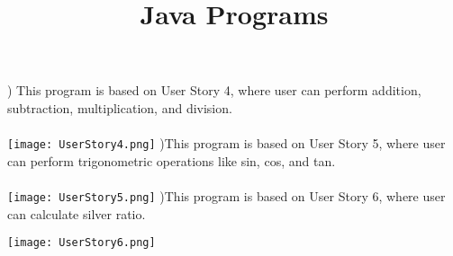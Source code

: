\documentclass[12pt]{article}
\begin{document}
\title{Java Programs}
\date{\vspace{-5ex}}
\maketitle

) This program is based on User Story 4, where user can perform addition, subtraction, multiplication, and division.\\\\


\texttt{[image: UserStory4.png]}
)This program is based on User Story 5, where user can perform trigonometric operations like sin, cos, and tan.\\\\


\texttt{[image: UserStory5.png]}
)This program is based on User Story 6, where user can calculate silver ratio.
\linebreak

\texttt{[image: UserStory6.png]}
\linebreak

 
\end{document}
